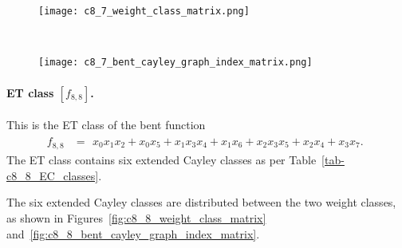 \begin{figure}[!bhpt] %
\centering
\begin{minipage}{.48\textwidth}
  \centering
  \texttt{[image: c8\_7\_weight\_class\_matrix.png]}
  \label{fig:c8_7_weight_class_matrix}
\end{minipage}%
~~~~
\begin{minipage}{.48\textwidth}
  \centering
  \texttt{[image: c8\_7\_bent\_cayley\_graph\_index\_matrix.png]}
  \label{fig:c8_7_bent_cayley_graph_index_matrix}
\end{minipage}
\end{figure}

\newpage
\paragraph*{ET class $[f_{8,8}]$.}
%
This is the ET class of the bent function
\small{}
\begin{align*}
f_{ 8 , 8 } &=
\begin{array}{l}
x_{0} x_{1} x_{2} + x_{0} x_{5} + x_{1} x_{3} x_{4} + x_{1} x_{6} + x_{2} x_{3} x_{5} + x_{2} x_{4}
+ x_{3} x_{7}.
\end{array}
\end{align*}
\normalsize{}
The ET class contains six extended Cayley classes as per Table~\ref{tab-c8_8_EC_classes}.

The six extended Cayley classes are distributed between the two weight classes,
as shown in Figures~\ref{fig:c8_8_weight_class_matrix} and~\ref{fig:c8_8_bent_cayley_graph_index_matrix}.

